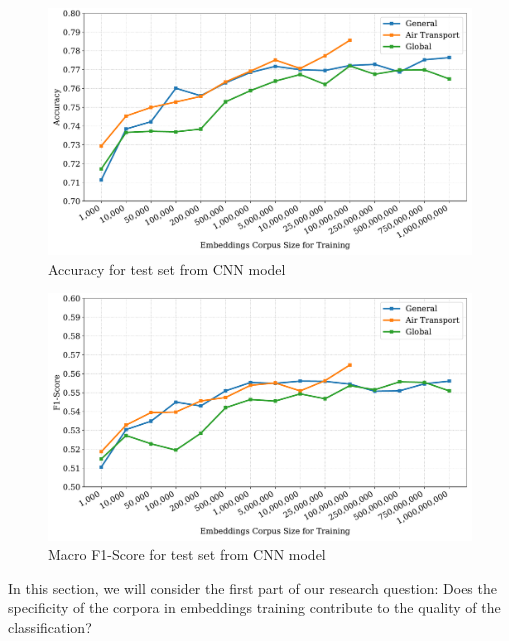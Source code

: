 \begin{figure}[htb]
    \centering
    \caption{Accuracy for test set from CNN model}
    \label{fig:accuracy_plot}
    \includegraphics[width=\textwidth]{images/chapters/acc_mean_final.pdf}
    
\end{figure}

\begin{figure}[htb]
    \centering
    \caption{Macro F1-Score for test set from CNN model}
    \label{fig:f1_plot}
    \includegraphics[width=\textwidth]{images/chapters/f1_score_mean_final.pdf}
    
\end{figure}


In this section, we will consider the first part of our research question: Does the specificity of the corpora in embeddings training contribute to the quality of the classification? 

